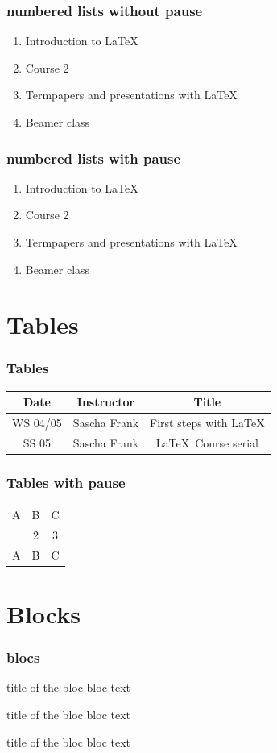 \documentclass{beamer}
\begin{document}
\begin{frame}\frametitle{numbered lists without pause}
	\begin{enumerate}
		\item<1> Introduction to  \LaTeX  
		\item<1> Course 2 
		\item<1> Termpapers and presentations with \LaTeX 
		\item<1> Beamer class
	\end{enumerate}
\end{frame}

\begin{frame}\frametitle{numbered lists with pause}
	\begin{enumerate}
		\item Introduction to  \LaTeX \pause 
		\item Course 2 \pause 
		\item Termpapers and presentations with \LaTeX \pause 
		\item Beamer class
	\end{enumerate}
\end{frame}

\section{Tables} 
\begin{frame}\frametitle{Tables}
	\begin{tabular}{|c|c|c|}
		\hline
		\textbf{Date} & \textbf{Instructor} & \textbf{Title} \\
		\hline
		WS 04/05 & Sascha Frank & First steps with  \LaTeX  \\
		\hline
		SS 05 & Sascha Frank & \LaTeX \ Course serial \\
		\hline
	\end{tabular}
\end{frame}

\begin{frame}\frametitle{Tables with pause}
	\begin{tabular}{c c c}
		A & B & C \\ 
		\pause 
		1 & 2 & 3 \\  
		\pause 
		A & B & C \\ 
	\end{tabular} 
\end{frame}


\section{Blocks}
\begin{frame}\frametitle{blocs}
	
	\begin{block}{title of the bloc}
		bloc text
	\end{block}
	
	\begin{exampleblock}{title of the bloc}
		bloc text
	\end{exampleblock}
	
	
	\begin{alertblock}{title of the bloc}
		bloc text
	\end{alertblock}
\end{frame}
\end{document}
